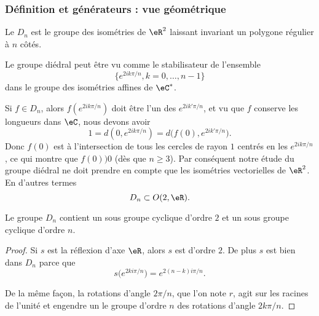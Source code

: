 \subsubsection{Définition et générateurs : vue géométrique}

\begin{definition}  \label{DEFooIWZGooAinSOh}
    Le  \( D_n\) est le groupe des isométries de \( \eR^2\) laissant invariant un polygone régulier à \( n\) côtés. 
\end{definition}
Le groupe diédral peut être vu comme le stabilisateur de l'ensemble
\begin{equation}
    \{  e^{2ik\pi/n},k=0,\ldots, n-1 \}
\end{equation}
dans le groupe des isométries affines de \( \eC^*\).

Si \( f\in D_n\), alors \( f( e^{2ik\pi/n}) \) doit être l'un des \(  e^{2ik'\pi/n}\), et vu que \( f\) conserve les longueurs dans \( \eC\), nous devons avoir
\begin{equation}
    1=d(0, e^{2ik\pi/n})=d\big( f(0), e^{2ik'\pi/n} \big).
\end{equation}
Donc \( f(0)\) est à l'intersection de tous les cercles de rayon \( 1\) centrés en les \(  e^{2ik\pi/n}\), ce qui montre que \( f(0))0\) (dès que \( n\geq 3\)). Par conséquent notre étude du groupe diédral ne doit prendre en compte que les isométries vectorielles de \( \eR^2\). En d'autres termes
\begin{equation}
    D_n\subset O(2,\eR).
\end{equation}

\begin{proposition}
    Le groupe \( D_n\) contient un sous groupe cyclique d'ordre \( 2\) et un sous groupe cyclique d'ordre \( n\).
\end{proposition}

\begin{proof}
    Si \( s\) est la réflexion d'axe \( \eR\), alors \( s\) est d'ordre \( 2\). De plus \( s\) est bien dans \( D_n\) parce que
    \begin{equation}    \label{EqSUshknP}
        s\big(  e^{2ki\pi/n} \big)= e^{2(n-k)i\pi/n}.
    \end{equation}

    De la même façon, la rotations d'angle \(2\pi/n\), que l'on note \( r\), agit sur les racines de l'unité et engendre un le groupe d'ordre \( n\) des rotations d'angle \(2 k\pi/n\).
\end{proof}

